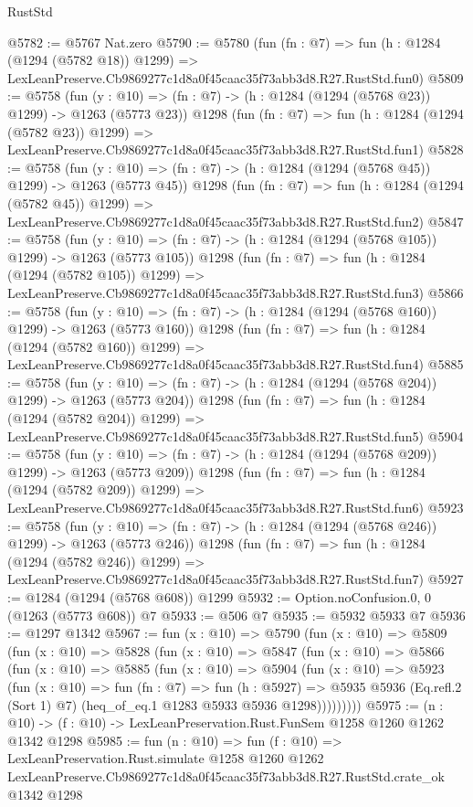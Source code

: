 \begin{lexlean}{RustStd}
\begin{coremodule}
@5782 := @5767 Nat.zero
@5790 := @5780
    (fun (fn : @7) =>
    fun (h : @1284 (@1294 (@5782 @18)) @1299) =>
    LexLeanPreserve.Cb9869277c1d8a0f45caac35f73abb3d8.R27.RustStd.fun0)
@5809 := @5758
    (fun (y : @10) => (fn : @7) -> (h : @1284 (@1294 (@5768 @23)) @1299) -> @1263 (@5773 @23))
    @1298
    (fun (fn : @7) =>
    fun (h : @1284 (@1294 (@5782 @23)) @1299) =>
    LexLeanPreserve.Cb9869277c1d8a0f45caac35f73abb3d8.R27.RustStd.fun1)
@5828 := @5758
    (fun (y : @10) => (fn : @7) -> (h : @1284 (@1294 (@5768 @45)) @1299) -> @1263 (@5773 @45))
    @1298
    (fun (fn : @7) =>
    fun (h : @1284 (@1294 (@5782 @45)) @1299) =>
    LexLeanPreserve.Cb9869277c1d8a0f45caac35f73abb3d8.R27.RustStd.fun2)
@5847 := @5758
    (fun (y : @10) => (fn : @7) -> (h : @1284 (@1294 (@5768 @105)) @1299) -> @1263 (@5773 @105))
    @1298
    (fun (fn : @7) =>
    fun (h : @1284 (@1294 (@5782 @105)) @1299) =>
    LexLeanPreserve.Cb9869277c1d8a0f45caac35f73abb3d8.R27.RustStd.fun3)
@5866 := @5758
    (fun (y : @10) => (fn : @7) -> (h : @1284 (@1294 (@5768 @160)) @1299) -> @1263 (@5773 @160))
    @1298
    (fun (fn : @7) =>
    fun (h : @1284 (@1294 (@5782 @160)) @1299) =>
    LexLeanPreserve.Cb9869277c1d8a0f45caac35f73abb3d8.R27.RustStd.fun4)
@5885 := @5758
    (fun (y : @10) => (fn : @7) -> (h : @1284 (@1294 (@5768 @204)) @1299) -> @1263 (@5773 @204))
    @1298
    (fun (fn : @7) =>
    fun (h : @1284 (@1294 (@5782 @204)) @1299) =>
    LexLeanPreserve.Cb9869277c1d8a0f45caac35f73abb3d8.R27.RustStd.fun5)
@5904 := @5758
    (fun (y : @10) => (fn : @7) -> (h : @1284 (@1294 (@5768 @209)) @1299) -> @1263 (@5773 @209))
    @1298
    (fun (fn : @7) =>
    fun (h : @1284 (@1294 (@5782 @209)) @1299) =>
    LexLeanPreserve.Cb9869277c1d8a0f45caac35f73abb3d8.R27.RustStd.fun6)
@5923 := @5758
    (fun (y : @10) => (fn : @7) -> (h : @1284 (@1294 (@5768 @246)) @1299) -> @1263 (@5773 @246))
    @1298
    (fun (fn : @7) =>
    fun (h : @1284 (@1294 (@5782 @246)) @1299) =>
    LexLeanPreserve.Cb9869277c1d8a0f45caac35f73abb3d8.R27.RustStd.fun7)
@5927 := @1284 (@1294 (@5768 @608)) @1299
@5932 := Option.noConfusion.{0, 0} (@1263 (@5773 @608)) @7
@5933 := @506 @7
@5935 := @5932 @5933 @7
@5936 := @1297 @1342
@5967 := fun (x : @10) =>
  @5790
    (fun (x : @10) =>
    @5809
      (fun (x : @10) =>
      @5828
        (fun (x : @10) =>
        @5847
          (fun (x : @10) =>
          @5866
            (fun (x : @10) =>
            @5885
              (fun (x : @10) =>
              @5904
                (fun (x : @10) =>
                @5923
                  (fun (x : @10) =>
                  fun (fn : @7) =>
                  fun (h : @5927) =>
                  @5935
                    @5936
                    (Eq.refl.{2} (Sort 1) @7)
                    (heq_of_eq.{1} @1283 @5933 @5936 @1298)))))))))
@5975 := (n : @10) -> (f : @10) -> LexLeanPreservation.Rust.FunSem @1258 @1260 @1262 @1342 @1298
@5985 := fun (n : @10) =>
  fun (f : @10) =>
  LexLeanPreservation.Rust.simulate
    @1258
    @1260
    @1262
    LexLeanPreserve.Cb9869277c1d8a0f45caac35f73abb3d8.R27.RustStd.crate_ok
    @1342
    @1298
\end{coremodule}
\end{lexlean}
